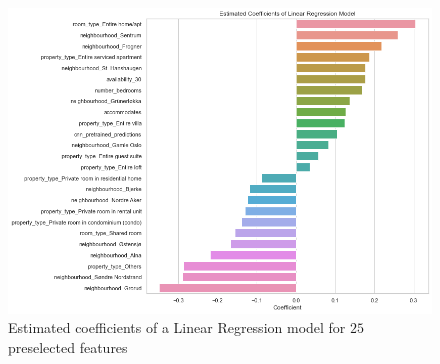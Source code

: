 \documentclass[12pt, letterpaper]{article}
\begin{document}
\newpage




\appendix

\begin{figure}[t]
    \centering
    \includegraphics[width=\textwidth]{coefficient_plot.png}
    \caption{Estimated coefficients of a Linear Regression model for $25$ preselected features}
    \label{fig:coefficient-plot}
\end{figure}
\end{document}
